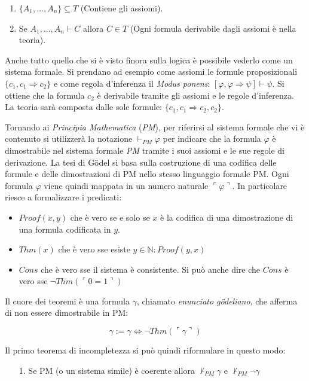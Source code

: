 \documentclass[./main.tex]{subfiles}
\begin{document}
\begin{enumerate}
  \item $\{A_1, ..., A_n\} \subseteq T$ (Contiene gli assiomi).
  \item Se $A_1, ..., A_n \vdash C$ allora $C \in T$ (Ogni formula derivabile dagli assiomi è nella teoria).
\end{enumerate}

Anche tutto quello che si è visto finora sulla logica è possibile vederlo come un sistema formale.
Si prendano ad esempio come assiomi le formule proposizionali $\{c_1, c_1 \Rightarrow c_2\}$ e come regola d'inferenza
il \textit{Modus ponens}: $[\varphi, \varphi \Rightarrow \psi] \vdash \psi$. Si ottiene che la formula 
$c_2$ è derivabile tramite gli assiomi e le regole d'inferenza.
La teoria sarà composta dalle sole formule: $\{c_1, c_1 \Rightarrow c_2, c_2\}$.


Tornando ai \textit{Principia Mathematica} (\textit{PM}), per riferirsi al sistema formale che vi è contenuto si utilizzerà
la notazione $\vdash_{PM} \varphi$ per indicare che la formula $\varphi$ è dimostrabile nel sistema formale \textit{PM} tramite i suoi assiomi
e le sue regole di derivazione. La tesi di Gödel si basa sulla costruzione di una codifica delle formule e delle dimostrazioni
di PM nello stesso linguaggio formale PM. 
Ogni formula $\varphi$ viene quindi mappata in un numero naturale $\ulcorner  \varphi \urcorner $.
In particolare riesce a formalizzare i predicati:
\begin{itemize}
  \item $Proof(x, y)$ che è vero se e solo se $x$ è la codifica di una dimostrazione di una formula codificata in $y$.
  \item $Thm(x)$ che è vero sse esiste $y\in \mathbb{N} : Proof(y, x)$
  \item $Cons$ che è vero sse il sistema è consistente. Si può anche dire che $Cons$ è vero sse $\lnot Thm(\ulcorner 0 = 1 \urcorner)$
\end{itemize}


Il cuore dei teoremi è una formula $\gamma$, chiamato \textit{enunciato gödeliano},
che afferma di non essere dimostrabile in PM:

$$\gamma := \gamma \Leftrightarrow \lnot Thm(\ulcorner \gamma \urcorner)$$

Il primo teorema di incompletezza si può quindi riformulare in questo modo:
\begin{enumerate}
  \item[1.] Se PM (o un sistema simile) è coerente allora $\nvdash_{PM} \gamma$ e $\nvdash_{PM} \lnot\gamma$
\end{enumerate}
\end{document}
